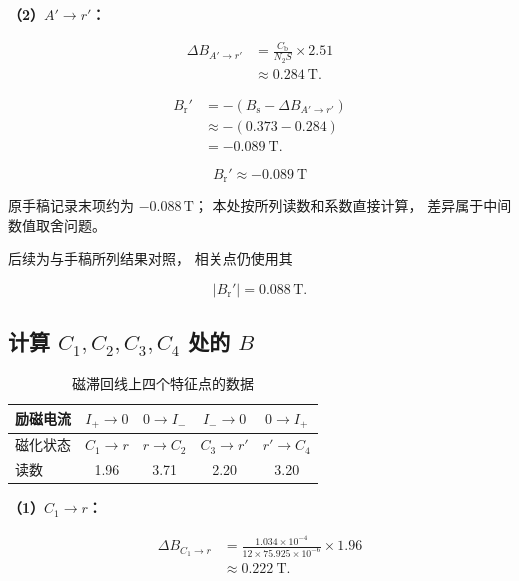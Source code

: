 \documentclass[UTF8,a4paper,12pt,fontset=none]{ctexart}
\newcommand{\Cb}{C_{\mathrm b}}
\newcommand{\Iplus}{I_{+}}
\newcommand{\Iminus}{I_{-}}
\begin{document}
\noindent
\textbf{（2）$A'\to r'$：}

\begin{align*}
\Delta B_{A'\to r'}
&=\frac{\Cb}{N_2S}\times2.51\\
&\approx0.284\ \mathrm T.
\end{align*}

\begin{align*}
B_{\mathrm r}'
&=-\left(
B_{\mathrm s}-\Delta B_{A'\to r'}
\right)\\
&\approx-(0.373-0.284)\\
&=-0.089\ \mathrm T.
\end{align*}

\[
\boxed{B_{\mathrm r}'\approx-0.089\ \mathrm T}
\]

原手稿记录末项约为 $-0.088\,\mathrm T$；
本处按所列读数和系数直接计算，
差异属于中间数值取舍问题。

后续为与手稿所列结果对照，
相关点仍使用其

\[
|B_{\mathrm r}'|=0.088\,\mathrm T.
\]


\subsection{计算 $C_1,C_2,C_3,C_4$ 处的 $B$}

\begin{table}[H]
\centering

\caption{磁滞回线上四个特征点的数据}

\begin{tabular}{lcccc}
\toprule

励磁电流
& $\Iplus\to0$
& $0\to\Iminus$
& $\Iminus\to0$
& $0\to\Iplus$
\\
\midrule

磁化状态
& $C_1\to r$
& $r\to C_2$
& $C_3\to r'$
& $r'\to C_4$
\\

读数
& 1.96
& 3.71
& 2.20
& 3.20
\\

\bottomrule
\end{tabular}
\end{table}


\noindent
\textbf{（1）$C_1\to r$：}

\begin{align*}
\Delta B_{C_1\to r}
&=\frac{1.034\times10^{-4}}
{12\times75.925\times10^{-6}}
\times1.96\\
&\approx0.222\ \mathrm T.
\end{align*}
\end{document}

